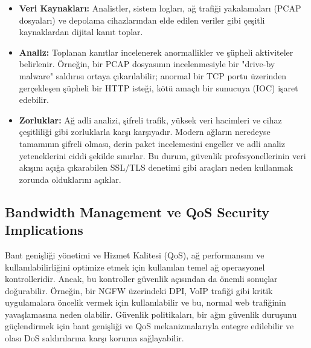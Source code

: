 \begin{itemize}
\item \textbf{Veri Kaynakları:} Analistler, sistem logları, ağ trafiği yakalamaları (PCAP dosyaları) ve depolama cihazlarından elde edilen veriler gibi çeşitli kaynaklardan dijital kanıt toplar.
\item \textbf{Analiz:} Toplanan kanıtlar incelenerek anormallikler ve şüpheli aktiviteler belirlenir. Örneğin, bir PCAP dosyasının incelenmesiyle bir "drive-by malware" saldırısı ortaya çıkarılabilir; anormal bir TCP portu üzerinden gerçekleşen şüpheli bir HTTP isteği, kötü amaçlı bir sunucuya (IOC) işaret edebilir.
\item \textbf{Zorluklar:} Ağ adli analizi, şifreli trafik, yüksek veri hacimleri ve cihaz çeşitliliği gibi zorluklarla karşı karşıyadır. Modern ağların neredeyse tamamının şifreli olması, derin paket incelemesini engeller ve adli analiz yeteneklerini ciddi şekilde sınırlar. Bu durum, güvenlik profesyonellerinin veri akışını açığa çıkarabilen SSL/TLS denetimi gibi araçları neden kullanmak zorunda olduklarını açıklar.
\end{itemize}

\subsection{Bandwidth Management ve QoS Security Implications}

Bant genişliği yönetimi ve Hizmet Kalitesi (QoS), ağ performansını ve kullanılabilirliğini optimize etmek için kullanılan temel ağ operasyonel kontrolleridir. Ancak, bu kontroller güvenlik açısından da önemli sonuçlar doğurabilir. Örneğin, bir NGFW üzerindeki DPI, VoIP trafiği gibi kritik uygulamalara öncelik vermek için kullanılabilir ve bu, normal web trafiğinin yavaşlamasına neden olabilir. Güvenlik politikaları, bir ağın güvenlik duruşunu güçlendirmek için bant genişliği ve QoS mekanizmalarıyla entegre edilebilir ve olası DoS saldırılarına karşı koruma sağlayabilir.
